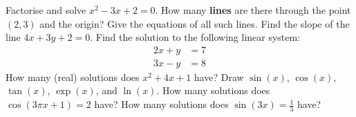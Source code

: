 \begin{questions}
  \question Factorise and solve $ x^2 - 3x + 2 = 0 $.
  \question How many \textbf{lines} are there through the point $ (2,3) $ and the origin? Give the equations of all such lines.
  \question Find the slope of the line $ 4x + 3y + 2 = 0 $.
  \question Find the solution to the following linear system:
            \begin{align*}
              2x + y &= 7\\
              3x - y &= 8
            \end{align*}
  \question How many (real) solutions does $ x^2 + 4x + 1 $ have?
  \question Draw $ \sin(x) $, $ \cos(x) $, $ \tan(x) $, $ \exp(x) $, and $ \ln(x) $.
  \question How many solutions does $ \cos (3\pi x + 1) = 2 $ have?
  \question How many solutions does $ \sin (3x) = \frac{1}{3} $ have?
\end{questions}


